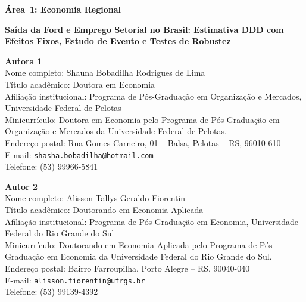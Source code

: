 \documentclass[12pt,a4paper]{article}
\begin{document}
\thispagestyle{empty}
\begin{center}
{\large\textbf{\'Area~1: Economia Regional}}

\bigskip

{\large\textbf{Sa\'ida da Ford e Emprego Setorial no Brasil: Estimativa DDD com
Efeitos Fixos, Estudo de Evento e Testes de Robustez}}
\end{center}

\bigskip\bigskip

\noindent\textbf{Autora 1}\\
Nome completo: Shauna Bobadilha Rodrigues de Lima\\
T\'itulo acad\^emico: Doutora em Economia\\
Afilia\c{c}\~ao institucional: Programa de P\'os-Gradua\c{c}\~ao em Organiza\c{c}\~ao e Mercados, Universidade Federal de Pelotas\\
Minicurr\'iculo: Doutora em Economia pelo Programa de P\'os-Gradua\c{c}\~ao em Organiza\c{c}\~ao e Mercados da Universidade Federal de Pelotas.\\
Endere\c{c}o postal: Rua Gomes Carneiro, 01 -- Balsa, Pelotas -- RS, 96010-610\\
E-mail: \texttt{shasha.bobadilha@hotmail.com}\\
Telefone: (53) 99966-5841\\

\bigskip

\noindent\textbf{Autor 2}\\
Nome completo: Alisson Tallys Geraldo Fiorentin\\
T\'itulo acad\^emico: Doutorando em Economia Aplicada\\
Afilia\c{c}\~ao institucional: Programa de P\'os-Gradua\c{c}\~ao em Economia, Universidade Federal do Rio Grande do Sul\\
Minicurr\'iculo: Doutorando em Economia Aplicada pelo Programa de P\'os-Gradua\c{c}\~ao em Economia da Universidade Federal do Rio Grande do Sul.\\
Endere\c{c}o postal: Bairro Farroupilha, Porto Alegre -- RS, 90040-040\\
E-mail: \texttt{alisson.fiorentin@ufrgs.br}\\
Telefone: (53) 99139-4392\\

\bigskip
\end{document}
